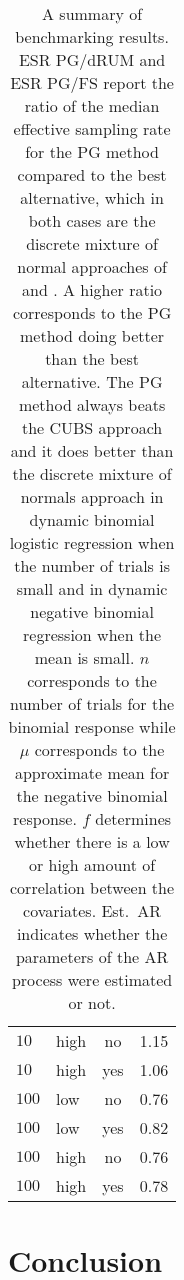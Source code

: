 \documentclass[12pt]{article}
\begin{document}
\begin{table}
\begin{tabular}{l l c c}
$10$ & high & no & 1.15 \\
$10$ & high & yes & 1.06 \\

$100$ & low & no & 0.76 \\
$100$ & low & yes & 0.82 \\

$100$ & high & no & 0.76 \\
$100$ & high & yes & 0.78 \\

\end{tabular}

\caption{\label{tab:benchmark-summary} A summary of benchmarking results. ESR
  PG/dRUM 
  and ESR PG/FS report the ratio of
  the median effective sampling rate for the PG method compared to the best
  alternative, which in both cases are the discrete mixture of normal approaches
  of \cite{fussl-etal-2013} and \cite{fruhwirth-schnatter-etal-2009}.  A higher
  ratio corresponds to the PG method doing better than the best alternative.  The
  PG method always beats the CUBS approach and it does better than the discrete
  mixture of normals approach in dynamic binomial logistic regression when the number of
  trials is small and in dynamic negative binomial regression when the 
  mean is small.  $n$ corresponds to the number of trials for the binomial
  response while $\mu$ corresponds to the approximate mean for the negative binomial
  response.  $f$ determines whether there is a low or high amount of correlation
  between the covariates.  Est.\ AR indicates whether the parameters of the AR
  process were estimated or not.
}
\end{table}



\section{Conclusion}
\end{document}
